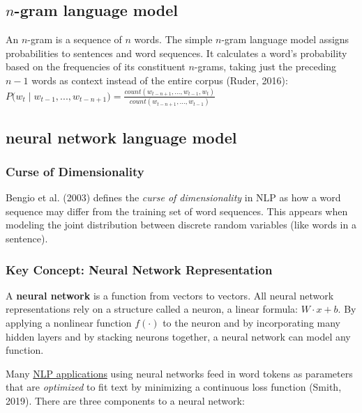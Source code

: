 \subsection{$n$-gram language model} \label{sec:NGramLM}

An $n$-gram is a sequence of $n$ words. The simple $n$-gram language model assigns probabilities to sentences and word sequences. It calculates a word's probability based on the frequencies of its constituent $n$-grams, taking just the preceding $n-1$ words as context instead of the entire corpus (Ruder, 2016): $P \Big(w_t \; | \; w_{t-1}, ..., w_{t-n+1} \Big) = \frac {count(w_{t-n+1},...,w_{t-1},w_t)} {count(w_{t-n+1},...,w_{t-1})}$



\subsection{neural network language model} \label{sec:NeuralLM}


\subsubsection{Curse of Dimensionality} \label{sec:CurseDim}

Bengio et al. (2003) defines the \emph{curse of dimensionality} in NLP as how a word sequence may differ from the training set of word sequences. This appears when modeling the joint distribution between discrete random variables (like words in a sentence). 

\subsubsection{Key Concept: Neural Network Representation} \label{sec:NeuralNetRepr}

A \textbf{neural network} is a function from vectors to vectors. All neural network representations rely on a structure called a neuron, a linear formula: $W \cdot x + b$. By applying a nonlinear function $f(\cdot)$ to the neuron and by incorporating many hidden layers and by stacking neurons together, a neural network can model any function. %

Many \hyperref[app:Appendix_NLPTasks]{NLP applications} using neural networks feed in word tokens as parameters that are \emph{optimized} to fit text by minimizing a continuous loss function (Smith, 2019). There are three components to a neural network: 


